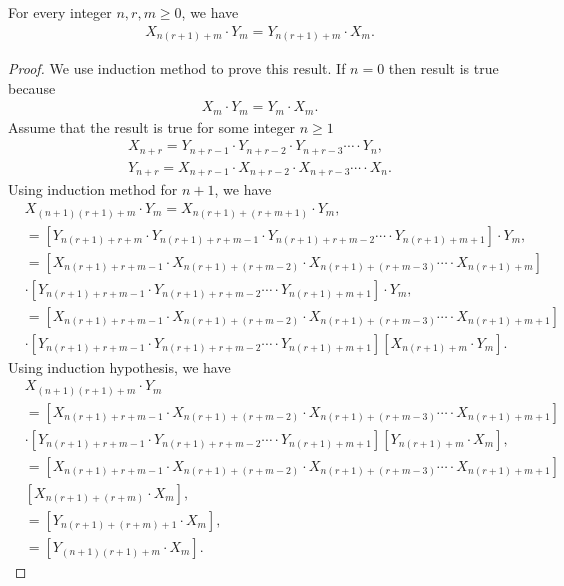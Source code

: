 \begin{theorem} For every integer $n, r, m\geq0$, we have
\begin{align*}
X_{n(r+1)+m}\cdot Y_{m}=Y_{n(r+1)+m}\cdot X_{m}.
\end{align*}
\end{theorem}
\begin{proof} We use induction method to prove this result. If $n=0$ then result is true because
\begin{align*}
X_{m}\cdot Y_{m}=Y_{m}\cdot X_{m}.
\end{align*}
Assume that the result is true for some integer $n\geq1$
	\begin{align*}
	X_{n+r}=Y_{n+r-1}\cdot Y_{n+r-2}\cdot Y_{n+r-3}\cdots\cdot Y_{n}, \\
	Y_{n+r}=X_{n+r-1}\cdot X_{n+r-2}\cdot X_{n+r-3}\cdots\cdot X_{n}.
	\end{align*}
Using induction method for $n+1$, we have
\begin{align*}
&X_{(n+1)(r+1)+m}\cdot Y_{m}=X_{n(r+1)+(r+m+1)}\cdot Y_{m},\\
&=\left[Y_{n(r+1)+r+m}\cdot Y_{n(r+1)+r+m-1}\cdot Y_{n(r+1)+r+m-2}\cdots\cdot Y_{n(r+1)+m+1}\right]\cdot Y_{m},\\
&=\left[X_{n(r+1)+r+m-1}\cdot X_{n(r+1)+(r+m-2)}\cdot X_{n(r+1)+(r+m-3)}\cdots\cdot X_{n(r+1)+m}\right]\\
&\cdot\left[Y_{n(r+1)+r+m-1}\cdot Y_{n(r+1)+r+m-2}\cdots\cdot Y_{n(r+1)+m+1}\right]\cdot Y_{m},\\
&=\left[X_{n(r+1)+r+m-1}\cdot X_{n(r+1)+(r+m-2)}\cdot X_{n(r+1)+(r+m-3)}\cdots\cdot X_{n(r+1)+m+1}\right]\\
&\cdot\left[Y_{n(r+1)+r+m-1}\cdot Y_{n(r+1)+r+m-2}\cdots\cdot Y_{n(r+1)+m+1}\right]\left[X_{n(r+1)+m}\cdot Y_{m}\right].
\end{align*}
Using induction hypothesis, we have
\begin{align*}
&X_{(n+1)(r+1)+m}\cdot Y_{m}\\&=\left[X_{n(r+1)+r+m-1}\cdot X_{n(r+1)+(r+m-2)}\cdot X_{n(r+1)+(r+m-3)}\cdots\cdot X_{n(r+1)+m+1}\right]\\
&\cdot\left[Y_{n(r+1)+r+m-1}\cdot Y_{n(r+1)+r+m-2}\cdots\cdot Y_{n(r+1)+m+1}\right]\left[Y_{n(r+1)+m}\cdot X_{m}\right],\\
&=\left[X_{n(r+1)+r+m-1}\cdot X_{n(r+1)+(r+m-2)}\cdot X_{n(r+1)+(r+m-3)}\cdots\cdot X_{n(r+1)+m+1}\right]\\&\left[X_{n(r+1)+(r+m)}\cdot X_{m}\right],\\
&=\left[Y_{n(r+1)+(r+m)+1}\cdot X_{m}\right],\\
&=\left[Y_{(n+1)(r+1)+m}\cdot X_{m}\right].
\end{align*}
\end{proof}
